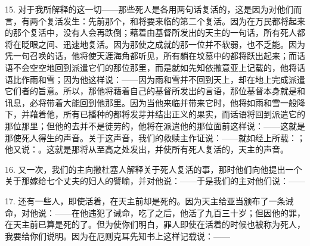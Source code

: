 15. 对于我所解释的这一切——那些死人是各用两句话复活的，这是因为对他们而言，有两个复活发生：先前那个，和将要来临的第二个复活。因为在万民都将起来的那个复活中，没有人会再跌倒；藉着由基督所发出的天主的一句话，所有死人都将在眨眼之间、迅速地复活。因为那使之成就的那一位并不软弱，也不乏能。因为凭一句召唤的话，他将使天涯海角都听见，所有躺在坟墓中的都将跃出起来；而话语不会空空地回到派遣它们的那位那里，而是就如先知依撒意亚上记载的，他将话语比作雨和雪；因为他这样说：——因为雨和雪并不回到天上，却在地上完成派遣它们者的旨意。所以，那他将藉着自己的基督所发出的言语，那位基督本身就是和讯息，必将带着大能回到他那里。因为当他来临并带来它时，他将如雨和雪一般降下，并藉着他，所有已播种的都将发芽并结出正义的果实，而话语将回到派遣它的那位那里；但他的去并不是徒劳的，他将在派遣他的那位面前这样说：——这就是那使死人得生的声音。关于这声音，我们的救赎主作证说：——就如经上所载：；他又说：。这就是那将从至高之处发出，并使所有死人复活的，天主的声音。\par

16. 又一次，我们的主向撒杜塞人解释关于死人复活的事，那时他们向他提出一个关于那嫁给七个丈夫的妇人的譬喻，并对他说：——于是我们的主对他们说：——\par

17. 还有一些人，即使活着，在天主前却是死的。因为天主给亚当颁布了一条诫命，对他说：——在他违犯了诫命，吃了之后，他活了九百三十岁；但因他的罪，在天主前已算是死的了。但为使你们明白，罪人即使在活着的时候也被称为死人，我要给你们说明。因为在厄则克耳先知书上这样记载说：——\par

